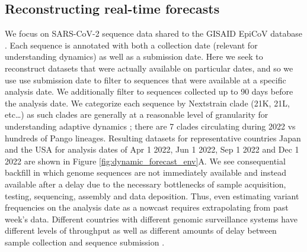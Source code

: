 \documentclass[11pt,oneside,letterpaper]{article}
\begin{document}
\subsection*{Reconstructing real-time forecasts}

We focus on SARS-CoV-2 sequence data shared to the GISAID EpiCoV database \cite{shu2017gisaid}.
Each sequence is annotated with both a collection date (relevant for understanding dynamics) as well as a submission date.
Here we seek to reconstruct datasets that were actually available on particular dates, and so we use use submission date to filter to sequences that were available at a specific analysis date.
We additionally filter to sequences collected up to 90 days before the analysis date.
We categorize each sequence by Nextstrain clade (21K, 21L, etc\dots) as such clades are generally at a reasonable level of granularity for understanding adaptive dynamics \cite{bloom2023fitness}; there are 7 clades circulating during 2022 vs hundreds of Pango lineages.
Resulting datasets for representative countries Japan and the USA for analysis dates of Apr 1 2022, Jun 1 2022, Sep 1 2022 and Dec 1 2022 are shown in Figure \ref{fig:dynamic_forecast_env}A.
We see consequential backfill in which genome sequences are not immediately available and instead available after a delay due to the necessary bottlenecks of sample acquisition, testing, sequencing, assembly and data deposition.
Thus, even estimating variant frequencies on the analysis date as a nowcast requires extrapolating from past week's data.
Different countries with different genomic surveillance systems have different levels of throughput as well as different amounts of delay between sample collection and sequence submission \cite{brito2022global}.
\end{document}
